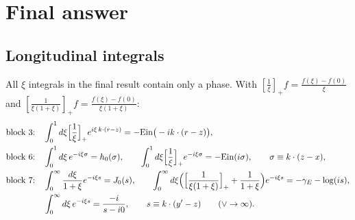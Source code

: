 \documentclass[10pt]{article}
\numberwithin{equation}{section}
\begin{document}
\section{Final answer}

\subsection{Longitudinal integrals}
All $\xi$ integrals in the final result contain only a phase. With $[\frac1\xi]_{+}f=\frac{f(\xi)-f(0)}{\xi}$ and $[\frac{1}{\xi(1+\xi)}]_{+}f=\frac{f(\xi)-f(0)}{\xi(1+\xi)}$:
\begin{align}
\text{block 3:}&\quad\int_{0}^{1}d\xi\Big[\frac1\xi\Big]_{+}e^{i\xi\,k\cdot(r-z)}=-{\rm Ein}\big(-ik\cdot(r-z)\big),\notag\\
\text{block 6:}&\quad\int_{0}^{1}d\xi\,e^{-i\xi\sigma}=h_{0}(\sigma),\qquad\int_{0}^{1}d\xi\Big[\frac1\xi\Big]_{+}e^{-i\xi\sigma}=-{\rm Ein}(i\sigma),\qquad\sigma\equiv k\cdot(z-x),\notag\\
\text{block 7:}&\quad\int_{0}^{\infty}\frac{d\xi}{1+\xi}e^{-i\xi s}=J_{0}(s),\qquad\int_{0}^{\infty}d\xi\Big(\Big[\frac{1}{\xi(1+\xi)}\Big]_{+}+\frac{1}{1+\xi}\Big)e^{-i\xi s}=-\gamma_{E}-\log(is),\notag\\
&\quad\int_{0}^{\infty}d\xi\,e^{-i\xi s}=\frac{-i}{s-i0},\qquad s\equiv k\cdot(y'-z)\qquad(\vee\to\infty).
\end{align}
\end{document}
